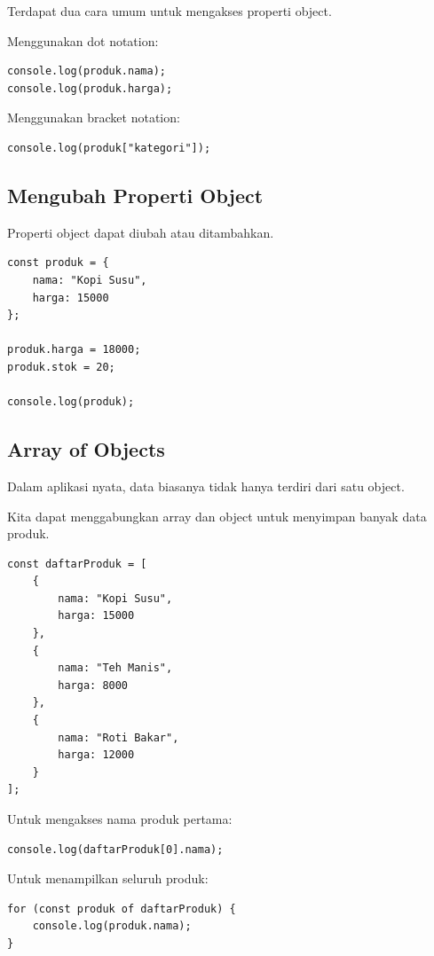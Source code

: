 \documentclass[12pt,a4paper]{article}
\begin{document}
Terdapat dua cara umum untuk mengakses properti
object.

Menggunakan dot notation:

\begin{lstlisting}
console.log(produk.nama);
console.log(produk.harga);
\end{lstlisting}

Menggunakan bracket notation:

\begin{lstlisting}
console.log(produk["kategori"]);
\end{lstlisting}

\subsection{Mengubah Properti Object}

Properti object dapat diubah atau ditambahkan.

\begin{lstlisting}
const produk = {
    nama: "Kopi Susu",
    harga: 15000
};

produk.harga = 18000;
produk.stok = 20;

console.log(produk);
\end{lstlisting}

\subsection{Array of Objects}

Dalam aplikasi nyata, data biasanya tidak hanya
terdiri dari satu object.

Kita dapat menggabungkan array dan object untuk
menyimpan banyak data produk.

\begin{lstlisting}
const daftarProduk = [
    {
        nama: "Kopi Susu",
        harga: 15000
    },
    {
        nama: "Teh Manis",
        harga: 8000
    },
    {
        nama: "Roti Bakar",
        harga: 12000
    }
];
\end{lstlisting}

Untuk mengakses nama produk pertama:

\begin{lstlisting}
console.log(daftarProduk[0].nama);
\end{lstlisting}

Untuk menampilkan seluruh produk:

\begin{lstlisting}
for (const produk of daftarProduk) {
    console.log(produk.nama);
}
\end{lstlisting}
\end{document}
